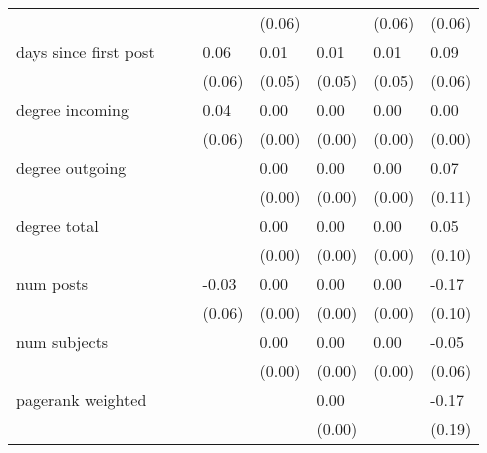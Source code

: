 \begin{table*}
\begin{center}
\begin{tabular}{llllllll}
                                                 &          &            &         & (0.06)  &              & (0.06)             & (0.06)    \\
 days since first post                      &          &            & 0.06    & 0.01    & 0.01         & 0.01               & 0.09      \\
                                                 &          &            & (0.06)  & (0.05)  & (0.05)       & (0.05)             & (0.06)    \\
 degree incoming                            &          &            & 0.04    & 0.00    & 0.00         & 0.00               & 0.00      \\
                                                 &          &            & (0.06)  & (0.00)  & (0.00)       & (0.00)             & (0.00)    \\
 degree outgoing                            &          &            &         & 0.00    & 0.00         & 0.00               & 0.07      \\
                                                 &          &            &         & (0.00)  & (0.00)       & (0.00)             & (0.11)    \\
 degree total                               &          &            &         & 0.00    & 0.00         & 0.00               & 0.05      \\
                                                 &          &            &         & (0.00)  & (0.00)       & (0.00)             & (0.10)    \\
 num posts                                  &          &            & -0.03   & 0.00    & 0.00         & 0.00               & -0.17     \\
                                                 &          &            & (0.06)  & (0.00)  & (0.00)       & (0.00)             & (0.10)    \\
 num subjects                               &          &            &         & 0.00    & 0.00         & 0.00               & -0.05     \\
                                                 &          &            &         & (0.00)  & (0.00)       & (0.00)             & (0.06)    \\
 pagerank weighted                          &          &            &         &         & 0.00         &                    & -0.17     \\
                                                 &          &            &         &         & (0.00)       &                    & (0.19)    \\

\end{tabular}
\end{center}
\end{table*}
